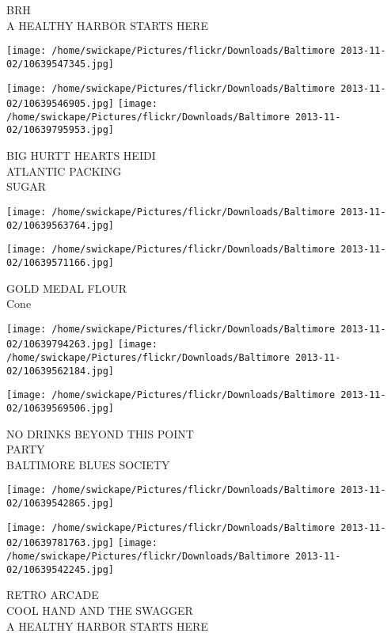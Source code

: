 \documentclass[10pt,letterpaper]{article}
\begin{document}
BRH\\
A HEALTHY HARBOR STARTS HERE\\
\pagebreak

\texttt{[image: /home/swickape/Pictures/flickr/Downloads/Baltimore 2013-11-02/10639547345.jpg]}

\vspace{0.25in}
\texttt{[image: /home/swickape/Pictures/flickr/Downloads/Baltimore 2013-11-02/10639546905.jpg]}
\texttt{[image: /home/swickape/Pictures/flickr/Downloads/Baltimore 2013-11-02/10639795953.jpg]}

BIG HURTT HEARTS HEIDI\\
ATLANTIC PACKING\\
SUGAR\\
\pagebreak

\texttt{[image: /home/swickape/Pictures/flickr/Downloads/Baltimore 2013-11-02/10639563764.jpg]}

\vspace{0.25in}
\texttt{[image: /home/swickape/Pictures/flickr/Downloads/Baltimore 2013-11-02/10639571166.jpg]}

GOLD MEDAL FLOUR\\
Cone\\
\pagebreak

\texttt{[image: /home/swickape/Pictures/flickr/Downloads/Baltimore 2013-11-02/10639794263.jpg]}
\texttt{[image: /home/swickape/Pictures/flickr/Downloads/Baltimore 2013-11-02/10639562184.jpg]}

\texttt{[image: /home/swickape/Pictures/flickr/Downloads/Baltimore 2013-11-02/10639569506.jpg]}

NO DRINKS BEYOND THIS POINT\\
PARTY\\
BALTIMORE BLUES SOCIETY\\
\pagebreak

\texttt{[image: /home/swickape/Pictures/flickr/Downloads/Baltimore 2013-11-02/10639542865.jpg]}

\vspace{0.25in}
\texttt{[image: /home/swickape/Pictures/flickr/Downloads/Baltimore 2013-11-02/10639781763.jpg]}
\texttt{[image: /home/swickape/Pictures/flickr/Downloads/Baltimore 2013-11-02/10639542245.jpg]}

RETRO ARCADE\\
COOL HAND AND THE SWAGGER\\
A HEALTHY HARBOR STARTS HERE\\
\pagebreak
\end{document}
